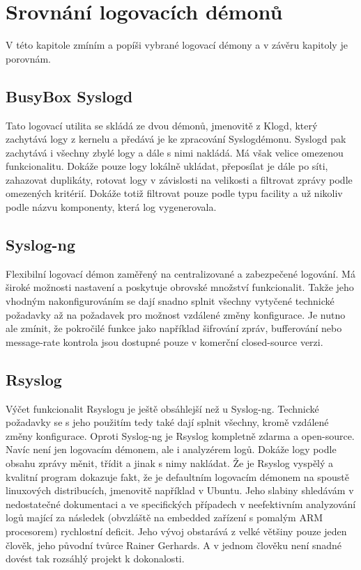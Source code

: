 \documentclass[thesis=B,czech]{FITthesis}[2012/06/26]
\begin{document}
\section{Srovnání logovacích démonů}
V této kapitole zmíním a popíši vybrané logovací démony a v závěru kapitoly je porovnám.

\subsection{BusyBox Syslogd}
Tato logovací utilita se skládá ze dvou démonů, jmenovitě z Klogd, který zachytává logy z kernelu a předává je ke zpracování Syslogdémonu. Syslogd pak zachytává i všechny zbylé logy a dále s nimi nakládá. Má však velice omezenou funkcionalitu. Dokáže pouze logy lokálně ukládat, přeposílat je dále po síti, zahazovat duplikáty, rotovat logy v závislosti na velikosti a filtrovat zprávy podle omezených kritérií. Dokáže totiž filtrovat pouze podle typu facility a už nikoliv podle názvu komponenty, která log vygenerovala.

\subsection{Syslog-ng}
Flexibilní logovací démon zaměřený na centralizované a zabezpečené logování. Má široké možnosti nastavení a poskytuje obrovské množství funkcionalit. Takže jeho vhodným nakonfigurováním se dají snadno splnit všechny vytyčené technické požadavky až na požadavek pro možnost vzdálené změny konfigurace.
Je nutno ale zmínit, že pokročilé funkce jako například šifrování zpráv, bufferování nebo message-rate kontrola jsou dostupné pouze v komerční closed-source verzi.

\subsection{Rsyslog}
Výčet funkcionalit Rsyslogu je ještě obsáhlejší než u Syslog-ng. Technické požadavky se s jeho použitím tedy také dají splnit všechny, kromě vzdálené změny konfigurace. Oproti Syslog-ng je Rsyslog kompletně zdarma a open-source. Navíc není jen logovacím démonem, ale i analyzérem logů. Dokáže logy podle obsahu zprávy měnit, třídit a jinak s nimy nakládat.
Že je Rsyslog vyspělý a kvalitní program dokazuje fakt, že je defaultním logovacím démonem na spoustě linuxových distribucích, jmenovitě například v Ubuntu.
Jeho slabiny shledávám v nedostatečné dokumentaci a ve specifických případech v neefektivním analyzování logů mající za následek (obvzláště na embedded zařízení s pomalým ARM procesorem) rychlostní deficit. Jeho vývoj obstarává z velké většiny pouze jeden člověk, jeho původní tvůrce Rainer Gerhards. A v jednom člověku není snadné dovést tak rozsáhlý projekt k dokonalosti.
\end{document}
